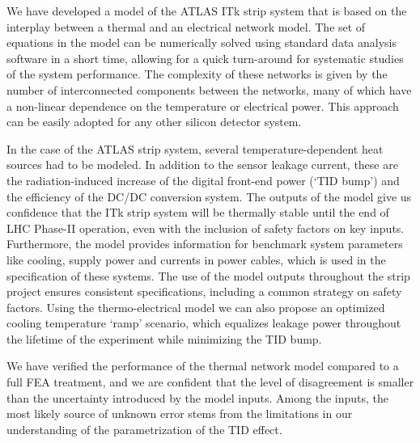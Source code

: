 We have developed a model of the ATLAS ITk strip system that is based on the interplay between a thermal and an electrical network model. The set of equations in the model can be numerically solved using standard data analysis software in a short time, allowing for a quick turn-around for systematic studies of the system performance. The complexity of these networks is given by the number of interconnected components between the networks, many of which have a non-linear dependence on the temperature or electrical power. This approach can be easily adopted for any other silicon detector system.

In the case of the ATLAS strip system, several temperature-dependent heat sources had to be modeled. In addition to the sensor leakage current, these are the  radiation-induced increase of the digital front-end power (`TID bump') and the efficiency of the DC/DC conversion system. The outputs of the model give us confidence that the ITk strip system will be thermally stable until the end of LHC Phase-II operation, even with the inclusion of safety factors on key inputs. Furthermore, the model provides information for benchmark system parameters like cooling, supply power and currents in power cables, which is used in the specification of these systems. The use of the model outputs throughout the strip project ensures consistent specifications, including a common strategy on safety factors. Using the thermo-electrical model we can also propose an optimized cooling temperature `ramp' scenario, which equalizes leakage power throughout the lifetime of the experiment while minimizing the TID bump.

We have verified the performance of the thermal network model compared to a full FEA treatment, and we are confident that the level of disagreement is smaller than the uncertainty introduced by the model inputs. Among the inputs, the most likely source of unknown error stems from the limitations in our understanding of the parametrization of the TID effect.
